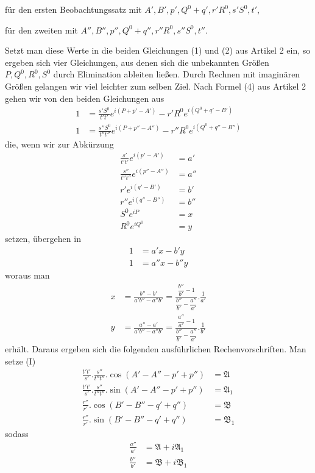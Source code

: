 für den ersten Beobachtungssatz mit $A',B',p',Q^0+q',r'R^0,s'S^0,t'$,

für den zweiten mit $A'',B'',p'',Q^0+q'',r''R^0,s''S^0,t''$.

Setzt man diese Werte in die beiden Gleichungen (1) und (2) aus Artikel 2 ein, so ergeben sich vier Gleichungen, aus denen sich die unbekannten Größen $P,Q^0,R^0,S^0$ durch Elimination ableiten ließen. Durch Rechnen mit imaginären Größen gelangen wir viel leichter zum selben Ziel. Nach Formel (4) aus Artikel 2 gehen wir von den beiden Gleichungen aus
\[
\begin{aligned}
1&=\frac{s'S^0}{t't'}e^{i(P+p'-A')}-r'R^0e^{i(Q^0+q'-B')}\\
1&=\frac{s''S^0}{t''t''}e^{i(P+p''-A'')}-r''R^0e^{i(Q^0+q''-B'')}
\end{aligned}
\]
die, wenn wir zur Abkürzung
\[
\begin{aligned}
\frac{s'}{t't'}e^{i(p'-A')}&=a'\\
\frac{s''}{t''t''}e^{i(p''-A'')}&=a''\\
r'e^{i(q'-B')}&=b'\\
r''e^{i(q''-B'')}&=b''\\
S^0e^{iP}&=x\\
R^0e^{iQ^0}&=y
\end{aligned}
\]
setzen, übergehen in
\[
\begin{aligned}
1&=a'x-b'y\\
1&=a''x-b''y
\end{aligned}
\]
woraus man
\[
\begin{aligned}
x&=\frac{b''-b'}{a'b''-a''b'}=\frac{\dfrac{b''}{b'}-1}{\dfrac{b''}{b'}-\dfrac{a''}{a'}}.\frac{1}{a'}\\[1ex]
y&=\frac{a''-a'}{a'b''-a''b'}=\frac{\dfrac{a''}{a'}-1}{\dfrac{b''}{b'}-\dfrac{a''}{a'}}.\frac{1}{b'}
\end{aligned}
\]
erhält. Daraus ergeben sich die folgenden ausführlichen Rechenvorschriften. Man setze (I)
\[
\begin{aligned}
\frac{t't'}{s'}.\frac{s''}{t''t''}.\cos(A'-A''-p'+p'')&=\mathfrak{A}\\
\frac{t't'}{s'}.\frac{s''}{t''t''}.\sin(A'-A''-p'+p'')&=\mathfrak{A}_1\\
\frac{r''}{r'}.\cos(B'-B''-q'+q'')&=\mathfrak{B}\\
\frac{r''}{r'}.\sin(B'-B''-q'+q'')&=\mathfrak{B}_1
\end{aligned}
\]
sodass
\[
\begin{aligned}
\frac{a''}{a'}&=\mathfrak{A}+i\mathfrak{A}_1\\
\frac{b''}{b'}&=\mathfrak{B}+i\mathfrak{B}_1
\end{aligned}
\]
